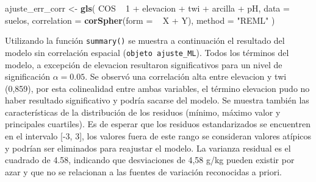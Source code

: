 \documentclass[11pt,b5paper,]{krantz}
\newenvironment{Shaded}{}{}
\newcommand{\KeywordTok}[1]{\textcolor[rgb]{0.00,0.44,0.13}{\textbf{#1}}}
\newcommand{\DataTypeTok}[1]{\textcolor[rgb]{0.56,0.13,0.00}{#1}}
\newcommand{\DecValTok}[1]{\textcolor[rgb]{0.25,0.63,0.44}{#1}}
\newcommand{\StringTok}[1]{\textcolor[rgb]{0.25,0.44,0.63}{#1}}
\newcommand{\OperatorTok}[1]{\textcolor[rgb]{0.40,0.40,0.40}{#1}}
\newcommand{\NormalTok}[1]{#1}
\begin{document}
\begin{Shaded}
\begin{Highlighting}[]
\NormalTok{ajuste_err_corr <-}\StringTok{ }\KeywordTok{gls}\NormalTok{(}
\NormalTok{  COS }\OperatorTok{~}\StringTok{ }\DecValTok{1} \OperatorTok{+}\StringTok{ }\NormalTok{elevacion }\OperatorTok{+}\StringTok{ }\NormalTok{twi }\OperatorTok{+}\StringTok{ }\NormalTok{arcilla }\OperatorTok{+}\StringTok{ }\NormalTok{pH,}
  \DataTypeTok{data =}\NormalTok{ suelos,}
  \DataTypeTok{correlation =} \KeywordTok{corSpher}\NormalTok{(}\DataTypeTok{form =}  \OperatorTok{~}\StringTok{ }\NormalTok{X }\OperatorTok{+}\StringTok{ }\NormalTok{Y),}
  \DataTypeTok{method =} \StringTok{"REML"}
\NormalTok{)}
\end{Highlighting}
\end{Shaded}

Utilizando la función \texttt{summary()} se muestra a continuación el
resultado del modelo sin correlación espacial
(\texttt{objeto\ ajuste\_ML}). Todos los términos del modelo, a
excepción de elevacion resultaron significativos para un nivel de
significación \(\alpha=0.05\). Se observó una correlación alta entre
elevacion y twi (0,859), por esta colinealidad entre ambas variables, el
término elevacion pudo no haber resultado significativo y podría sacarse
del modelo. Se muestra también las características de la distribución de
los residuos (mínimo, máximo valor y principales cuartiles). Es de
esperar que los residuos estandarizados se encuentren en el intervalo
{[}-3, 3{]}, los valores fuera de este rango se consideran valores
atípicos y podrían ser eliminados para reajustar el modelo. La varianza
residual es el cuadrado de 4.58, indicando que desviaciones de 4,58 g/kg
pueden existir por azar y que no se relacionan a las fuentes de
variación reconocidas a priori.
\end{document}
